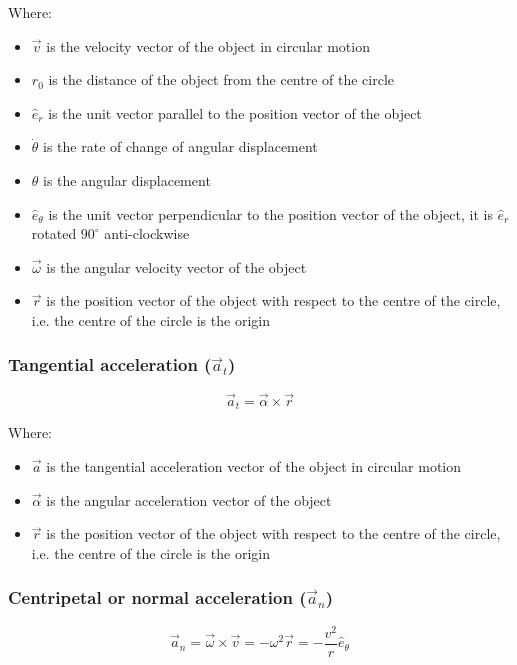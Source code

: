 \documentclass[11pt]{article}
\begin{document}
Where:
\begin{itemize}
\item \(\vec{v}\) is the velocity vector of the object in circular motion
\item \(r_0\) is the distance of the object from the centre of the circle
\item \(\hat{e}_r\) is the unit vector parallel to the position vector of the object
\item \(\dot{\theta}\) is the rate of change of angular displacement
\item \(\theta\) is the angular displacement
\item \(\hat{e}_{\theta}\) is the unit vector perpendicular to the position vector of the object, it is \(\hat{e}_r\) rotated \(90^{\circ}\) anti-clockwise
\item \(\vec{\omega}\) is the angular velocity vector of the object
\item \(\vec{r}\) is the position vector of the object with respect to the centre of the circle, i.e. the centre of the circle is the origin
\end{itemize}

\subsubsection{Tangential acceleration (\(\vec{a}_t\))}
\label{sec:orgb440e9c}
\[\vec{a}_t = \vec{\alpha} \times \vec{r}\]

Where:
\begin{itemize}
\item \(\vec{a}\) is the tangential acceleration vector of the object in circular motion
\item \(\vec{\alpha}\) is the angular acceleration vector of the object
\item \(\vec{r}\) is the position vector of the object with respect to the centre of the circle, i.e. the centre of the circle is the origin
\end{itemize}

 \newpage

\subsubsection{Centripetal or normal acceleration (\(\vec{a}_n\))}
\label{sec:orgfba6892}
\[\vec{a}_n = \vec{\omega} \times \vec{v} = - \omega^2 \vec{r} = - \frac{v^2}{r} \hat{e}_{\theta}\]
\end{document}
